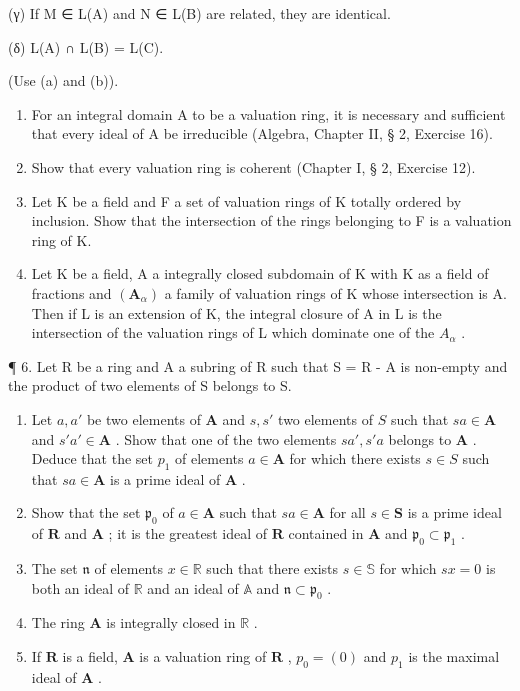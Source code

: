 (γ) If M ∈ L(A) and N ∈ L(B) are related, they are identical.

(δ) L(A) ∩ L(B) = L(C).

(Use (a) and (b)).

\begin{enumerate}
\def\labelenumi{\arabic{enumi}.}
\setcounter{enumi}{1}
\item
  For an integral domain A to be a valuation ring, it is necessary and sufficient that every ideal of A be irreducible (Algebra, Chapter II, § 2, Exercise 16).
\item
  Show that every valuation ring is coherent (Chapter I, § 2, Exercise 12).
\item
  Let K be a field and F a set of valuation rings of K totally ordered by inclusion. Show that the intersection of the rings belonging to F is a valuation ring of K.
\item
  Let K be a field, A a integrally closed subdomain of K with K as a field of fractions and \((\mathbf{A}_{\alpha})\) a family of valuation rings of K whose intersection is A. Then if L is an extension of K, the integral closure of A in L is the intersection of the valuation rings of L which dominate one of the \(A_{\alpha}\) .
\end{enumerate}

¶ 6. Let R be a ring and A a subring of R such that S = R - A is non-empty and the product of two elements of S belongs to S.

\begin{enumerate}
\def\labelenumi{(\alph{enumi})}
\item
  Let \(a, a'\) be two elements of \(\mathbf{A}\) and \(s, s'\) two elements of \(S\) such that \(sa \in \mathbf{A}\) and \(s'a' \in \mathbf{A}\) . Show that one of the two elements \(sa', s'a\) belongs to \(\mathbf{A}\) . Deduce that the set \(p_1\) of elements \(a \in \mathbf{A}\) for which there exists \(s \in S\) such that \(sa \in \mathbf{A}\) is a prime ideal of \(\mathbf{A}\) .
\item
  Show that the set \(\mathfrak{p}_0\) of \(a \in \mathbf{A}\) such that \(sa \in \mathbf{A}\) for all \(s \in \mathbf{S}\) is a prime ideal of \(\mathbf{R}\) and \(\mathbf{A}\) ; it is the greatest ideal of \(\mathbf{R}\) contained in \(\mathbf{A}\) and \(\mathfrak{p}_0 \subset \mathfrak{p}_1\) .
\item
  The set \(\mathfrak{n}\) of elements \(x \in \mathbb{R}\) such that there exists \(s \in \mathbb{S}\) for which \(sx = 0\) is both an ideal of \(\mathbb{R}\) and an ideal of \(\mathbb{A}\) and \(\mathfrak{n} \subset \mathfrak{p}_0\) .
\item
  The ring \(\mathbf{A}\) is integrally closed in \(\mathbb{R}\) .
\item
  If \(\mathbf{R}\) is a field, \(\mathbf{A}\) is a valuation ring of \(\mathbf{R}\) , \(p_0 = (0)\) and \(p_1\) is the maximal ideal of \(\mathbf{A}\) .
\end{enumerate}

